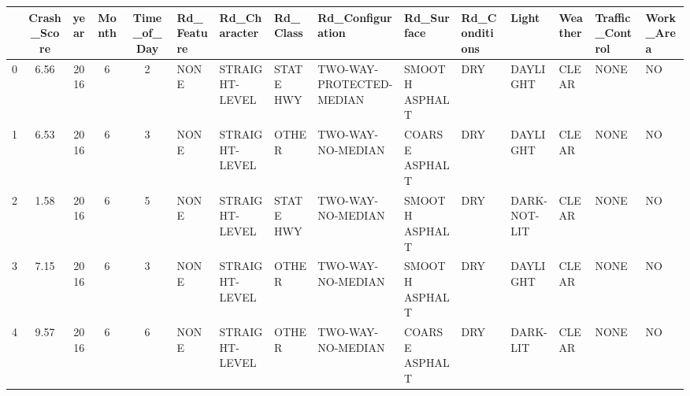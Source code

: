 \begin{tabular}{cccccp{2cm}p{2cm}p{2cm}p{2cm}p{2cm}p{2cm}p{2cm}p{2cm}p{2cm}p{2cm}}
\toprule
{} &  Crash\_Score &  year & Month & Time\_of\_Day & Rd\_Feature &    Rd\_Character &   Rd\_Class &          Rd\_Configuration &      Rd\_Surface & Rd\_Conditions &         Light & Weather & Traffic\_Control & Work\_Area \\
\midrule
0 &         6.56 &  2016 &     6 &           2 &       NONE &  STRAIGHT-LEVEL &  STATE HWY &  TWO-WAY-PROTECTED-MEDIAN &  SMOOTH ASPHALT &           DRY &      DAYLIGHT &   CLEAR &            NONE &        NO \\
1 &         6.53 &  2016 &     6 &           3 &       NONE &  STRAIGHT-LEVEL &      OTHER &         TWO-WAY-NO-MEDIAN &  COARSE ASPHALT &           DRY &      DAYLIGHT &   CLEAR &            NONE &        NO \\
2 &         1.58 &  2016 &     6 &           5 &       NONE &  STRAIGHT-LEVEL &  STATE HWY &         TWO-WAY-NO-MEDIAN &  SMOOTH ASPHALT &           DRY &  DARK-NOT-LIT &   CLEAR &            NONE &        NO \\
3 &         7.15 &  2016 &     6 &           3 &       NONE &  STRAIGHT-LEVEL &      OTHER &         TWO-WAY-NO-MEDIAN &  SMOOTH ASPHALT &           DRY &      DAYLIGHT &   CLEAR &            NONE &        NO \\
4 &         9.57 &  2016 &     6 &           6 &       NONE &  STRAIGHT-LEVEL &      OTHER &         TWO-WAY-NO-MEDIAN &  COARSE ASPHALT &           DRY &      DARK-LIT &   CLEAR &            NONE &        NO \\
\bottomrule
\end{tabular}
